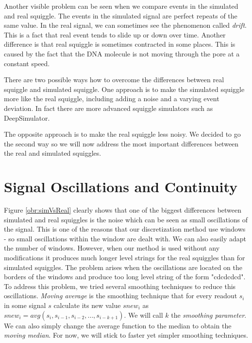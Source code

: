 Another visible problem can be seen when we compare events in the simulated and real squiggle.
The events in the simulated signal are perfect repeats of the same value. In the real signal, we can sometimes see
the phenomenon called \textit{drift}. This is a fact that real event tends to slide
up or down over time. Another difference is that real squiggle
is sometimes contracted in some places. This is caused by the fact that the DNA
molecule is not moving through the pore at a constant speed.

There are two possible ways how to overcome the differences between real squiggle
and simulated squiggle. One approach is to make the simulated squiggle more like
the real squiggle, including adding a noise and a varying event deviation. In fact there
are more advanced squiggle simulators such as DeepSimulator\cite{deepsimulator}.

The opposite approach is to make the real squiggle less noisy. We decided to go the
second way so we will now address the most important differences between the
real and simulated squiggles.

\section{Signal Oscillations and Continuity}
\label{subsection:oscillations}

Figure \ref{obr:simVsReal} clearly shows that one of the biggest differences between simulated and
real squiggles is the noise which can be seen as small oscillations of the signal. This is
one of the reasons that our discretization method use windows - so small oscillations within the window
are dealt with. We can also easily adapt the number of windows.
However, when our method is used without any modifications it
produces much longer level strings for the real squiggles than for simulated squiggles.
The problem arises when the oscillations are located on the borders of the windows
and produce too long level string of the form "cdcdcdcd".
To address this problem, we tried several smoothing techniques to reduce this oscillations. \textit{Moving average} is the
smoothing technique that for every readout $s_i$ in some signal $s$ calculate its new value
$snew_i$ as $snew_i = avg(s_{i}, s_{i-1}, s_{i-2}, \dots , s_{i-k+1})$. We will call
$k$ the \textit{smoothing parameter}. We can also simply change
the average function to the median to obtain the \textit{moving median}. For now, we will stick
to faster yet simpler smoothing techniques.

